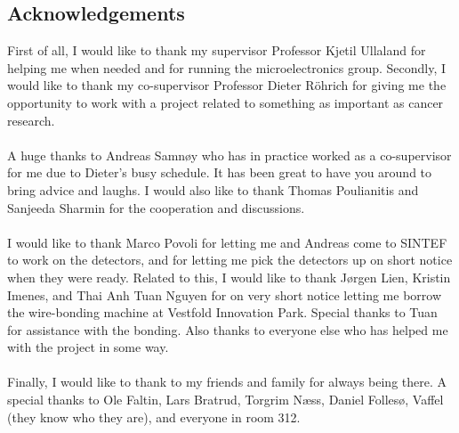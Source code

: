 \documentclass[12pt, a4paper]{report}
\begin{document}
\blankpage

\clearpage
{}
\begin{center}
\begin{minipage}{\textwidth}
\chapter*{Acknowledgements}
First of all, I would like to thank my supervisor Professor Kjetil Ullaland for helping me when needed and for running the microelectronics group. Secondly, I would like to thank my co-supervisor Professor Dieter Röhrich for giving me the opportunity to work with a project related to something as important as cancer research.
\\ \\
A huge thanks to Andreas Samnøy who has in practice worked as a co-supervisor for me due to Dieter's busy schedule. It has been great to have you around to bring advice and laughs. I would also like to thank Thomas Poulianitis and Sanjeeda Sharmin for the cooperation and discussions.
\\ \\ 
I would like to thank Marco Povoli for letting me and Andreas come to SINTEF to work on the detectors, and for letting me pick the detectors up on short notice when they were ready. Related to this, I would like to thank Jørgen Lien, Kristin Imenes, and Thai Anh Tuan Nguyen for on very short notice letting me borrow the wire-bonding machine at Vestfold Innovation Park. Special thanks to Tuan for assistance with the bonding. Also thanks to everyone else who has helped me with the project in some way.
\\ \\ 
Finally, I would like to thank to my friends and family for always being there. A special thanks to Ole Faltin, Lars Bratrud, Torgrim Næss, Daniel Follesø, Vaffel (they know who they are), and everyone in room 312. 

\end{minipage}
\end{center}
\clearpage
\end{document}
